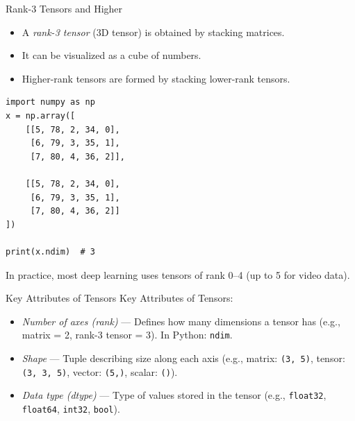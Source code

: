 \documentclass{beamer}
\begin{document}
\begin{frame}[fragile]{Rank-3 Tensors and Higher}
    \begin{itemize}
        \item A \textit{rank-3 tensor} (3D tensor) is obtained by stacking matrices.
        \item It can be visualized as a cube of numbers.
        \item Higher-rank tensors are formed by stacking lower-rank tensors.
    \end{itemize}

    \begin{center}
        \begin{tcolorbox}[
                width=0.7\textwidth,
                colback=gray!5,
                colframe=gray!60,
                boxrule=0.4pt,
                arc=3pt,
                left=6pt,right=6pt,top=6pt,bottom=6pt
            ]
            \begin{verbatim}
import numpy as np
x = np.array([
    [[5, 78, 2, 34, 0],
     [6, 79, 3, 35, 1],
     [7, 80, 4, 36, 2]],
    
    [[5, 78, 2, 34, 0],
     [6, 79, 3, 35, 1],
     [7, 80, 4, 36, 2]]
])

print(x.ndim)  # 3
\end{verbatim}
        \end{tcolorbox}
    \end{center}

    \vspace{0.5em}
    \small In practice, most deep learning uses tensors of rank 0–4 (up to 5 for video data).
\end{frame}

\begin{frame}{Key Attributes of Tensors}
    Key Attributes of Tensors:
    \begin{itemize}
        \item \textit{Number of axes (rank)} — Defines how many dimensions a tensor has
              (e.g., matrix = 2, rank-3 tensor = 3). In Python: \texttt{ndim}.
              \pause
        \item \textit{Shape} — Tuple describing size along each axis
              (e.g., matrix: \texttt{(3, 5)}, tensor: \texttt{(3, 3, 5)}, vector: \texttt{(5,)}, scalar: \texttt{()}).
              \pause
        \item \textit{Data type (dtype)} — Type of values stored in the tensor
              (e.g., \texttt{float32}, \texttt{float64}, \texttt{int32}, \texttt{bool}).
    \end{itemize}
\end{frame}
\end{document}
